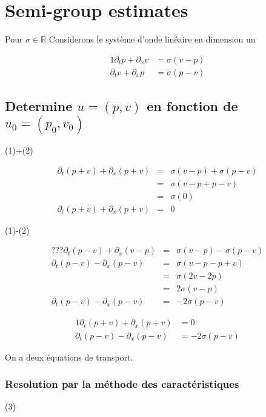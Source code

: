 \documentclass[a4paper,11pt]{article}
\begin{document}
\section{Semi-group estimates}
Pour \( \sigma \in \mathbb{R} \)
Considerons le système d'onde linéaire en dimension un

\begin{alignat}{1}
    \partial_{t}p + \partial_{x}v &= \sigma(v-p) \\
    \partial_{t}v + \partial_{x}p &= \sigma(p-v)
\end{alignat}

\subsection{Determine \( u = (p, v) \) en fonction de \( u_{0} = (p_{0}, v_{0}) \)}
(1)+(2)

\begin{equation*}
    \begin{array}{rcl}
        \partial_{t}(p+v) + \partial_{x}(p+v) &=& \sigma(v-p) + \sigma(p-v) \\
        &=& \sigma(v-p + p-v) \\
        &=& \sigma(0) \\
        \partial_{t}(p+v) + \partial_{x}(p+v) &=& 0
    \end{array}
\end{equation*}

(1)-(2)

\begin{equation*}
\begin{array}{rcl}
    ???\partial_{t}(p-v) + \partial_{x}(v-p) &=& \sigma(v-p) - \sigma(p-v) \\
    \partial_{t}(p-v) - \partial_{x}(p-v) &=& \sigma(v-p - p+v) \\
    &=& \sigma(2v-2p) \\
    &=& 2\sigma(v-p) \\
    \partial_{t}(p-v) - \partial_{x}(p-v) &=& -2\sigma(p-v)
\end{array}
\end{equation*}

\begin{alignat}{1}
    \partial_{t}(p+v) + \partial_{x}(p+v) &= 0 \\
    \partial_{t}(p-v) - \partial_{x}(p-v) &= -2\sigma(p-v)
\end{alignat}

On a deux équations de transport.

\subsubsection*{Resolution par la méthode des caractéristiques}
(3)
\end{document}
